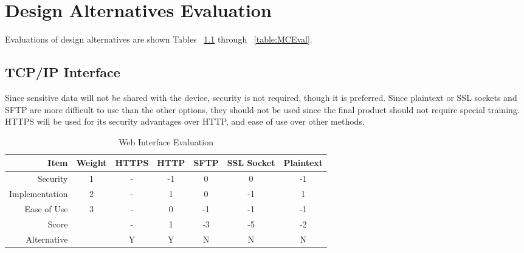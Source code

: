 \chapter{Design Alternatives Evaluation}
Evaluations of design alternatives are shown Tables ~\ref{table:TCPIP} through ~\ref{table:MCEval}.


\section{TCP/IP Interface}
Since sensitive data will not be shared with the device, security is not required, though it is preferred. 
Since plaintext or SSL sockets and SFTP are more difficult to use than the other options, they should not be used since the final product should not require special training. 
HTTPS will be used for its security advantages over HTTP, and ease of use over other methods. 

\begin{table}[h]
\caption{Web Interface Evaluation}
	\label{table:TCPIP}
	\centering
\begin{tabular}{|r|c|c|c|c|c|c|}
\hline
Item              	& Weight & HTTPS  & HTTP       & SFTP        & SSL Socket	& Plaintext\\ \hline
Security       	& 1      & -      & -1         & 0           & 0          	& -1   \\ \hline
Implementation	& 2      & -      & 1          & 0           & -1     		& 1   \\ \hline
Ease of Use       	& 3      & -      & 0          & -1          & -1         	& -1 \\ \hline
Score         	&        & -      & 1          & -3          & -5         	& -2   \\ \hline
Alternative     	&        & Y      & Y          & N           & N       	& N   \\ \hline
\end{tabular}
\end{table}

